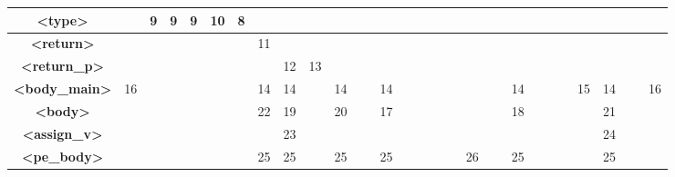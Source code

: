 \documentclass[a4paper,12pt]{article}
\begin{document}
\begin{landscape}
\begin{table}[!ht]
{\begin{tabular}{|c|c|c|c|c|c|c|c|c|c|c|c|c|c|c|c|c|c|c|c|c|c|c|c|c|}
				\textbf{\textless{}type\textgreater{}}        & ~                        & 9              & 9            & 9               & 10         & 8             & ~               & ~             & ~          & ~                                           & ~ & ~  & ~ & ~  & ~ & ~  & ~ & ~  & ~  & ~                                          & ~  & ~  & ~ & ~  \\ \hline
				\textbf{\textless{}return\textgreater{}}      & ~                        & ~              & ~            & ~               & ~          & ~             & 11              & ~             & ~          & ~                                           & ~ & ~  & ~ & ~  & ~ & ~  & ~ & ~  & ~  & ~                                          & ~  & ~  & ~ & ~  \\ \hline
				\textbf{\textless{}return\_p\textgreater{}}   & ~                        & ~              & ~            & ~               & ~          & ~             & ~               & 12            & 13         & ~                                           & ~ & ~  & ~ & ~  & ~ & ~  & ~ & ~  & ~  & ~                                          & ~  & ~  & ~ & ~  \\ \hline
				\textbf{\textless{}body\_main\textgreater{}}  & 16                       & ~              & ~            & ~               & ~          & ~             & 14              & 14            & ~          & 14                                          & ~ & 14 & ~ & ~  & ~ & ~  & ~ & 14 & ~  & ~                                          & 15 & 14 & ~ & 16 \\ \hline
				\textbf{\textless{}body\textgreater{}}        & ~                        & ~              & ~            & ~               & ~          & ~             & 22              & 19            & ~          & 20                                          & ~ & 17 & ~ & ~  & ~ & ~  & ~ & 18 & ~  & ~                                          & ~  & 21 & ~ & ~  \\ \hline
				\textbf{\textless{}assign\_v\textgreater{}}   & ~                        & ~              & ~            & ~               & ~          & ~             & ~               & 23            & ~          & ~                                           & ~ & ~  & ~ & ~  & ~ & ~  & ~ & ~  & ~  & ~                                          & ~  & 24 & ~ & ~  \\ \hline
				\textbf{\textless{}pe\_body\textgreater{}}    & ~                        & ~              & ~            & ~               & ~          & ~             & 25              & 25            & ~          & 25                                          & ~ & 25 & ~ & ~  & ~ & 26 & ~ & 25 & ~  & ~                                          & ~  & 25 & ~ & ~  \\ \hline

\end{tabular}}
\end{table}
\end{landscape}
\end{document}
